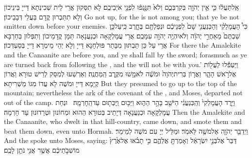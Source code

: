 {אַֽל\maqqaf תַּעֲל֔וּ כִּ֛י אֵ֥ין יְהֹוָ֖ה בְּקִרְבְּכֶ֑ם וְלֹא֙ תִּנָּ֣גְפ֔וּ לִפְנֵ֖י אֹיְבֵיכֶֽם׃}
{לָא תִסְּקוּן אֲרֵי לֵית שְׁכִינְתָא דַּייָ בֵּינֵיכוֹן וְלָא תִתַּבְרוּן קֳדָם בַּעֲלֵי דְּבָבֵיכוֹן׃}
{Go not up, for the \lord\space is not among you; that ye be not smitten down before your enemies.}{}
{כִּי֩ הָעֲמָלֵקִ֨י וְהַכְּנַעֲנִ֥י שָׁם֙ לִפְנֵיכֶ֔ם וּנְפַלְתֶּ֖ם בֶּחָ֑רֶב כִּֽי\maqqaf עַל\maqqaf כֵּ֤ן שַׁבְתֶּם֙ מֵאַחֲרֵ֣י יְהֹוָ֔ה וְלֹא\maqqaf יִהְיֶ֥ה יְהֹוָ֖ה עִמָּכֶֽם׃}
{אֲרֵי עֲמָלְקָאָה וּכְנַעֲנָאָה תַּמָּן קֳדָמֵיכוֹן וְתִפְּלוּן בְּחַרְבָּא אֲרֵי עַל כֵּן תַּבְתּוּן מִבָּתַר פּוּלְחָנָא דַּייָ וְלָא יְהֵי מֵימְרָא דַּייָ בְּסַעְדְּכוֹן׃}
{For there the Amalekite and the Canaanite are before you, and ye shall fall by the sword; forasmuch as ye are turned back from following the \lord, and the \lord\space will not be with you.’}{}
{וַיַּעְפִּ֕לוּ לַעֲל֖וֹת אֶל\maqqaf רֹ֣אשׁ הָהָ֑ר וַאֲר֤וֹן בְּרִית\maqqaf יְהֹוָה֙ וּמֹשֶׁ֔ה לֹא\maqqaf מָ֖שׁוּ מִקֶּ֥רֶב הַֽמַּחֲנֶֽה׃}
{וְאַרְשַׁעוּ לְמִסַּק לְרֵישׁ טוּרָא וַאֲרוֹן קְיָמָא דַּייָ וּמֹשֶׁה לָא עֲדוֹ מִגּוֹ מַשְׁרִיתָא׃}
{But they presumed to go up to the top of the mountain; nevertheless the ark of the covenant of the \lord, and Moses, departed not out of the camp.}{}
{וַיֵּ֤רֶד הָעֲמָלֵקִי֙ וְהַֽכְּנַעֲנִ֔י הַיֹּשֵׁ֖ב בָּהָ֣ר הַה֑וּא וַיַּכּ֥וּם וַֽיַּכְּת֖וּם עַד\maqqaf הַֽחׇרְמָֽה׃ \petucha }
{וּנְחַת עֲמָלְקָאָה וּכְנַעֲנָאָה דְּיָתֵיב בְּטוּרָא הַהוּא וּמְחוֹנוּן וּטְרַדוּנוּן עַד חָרְמָה׃}
{Then the Amalekite and the Canaanite, who dwelt in that hill-country, came down, and smote them and beat them down, even unto Hormah.}{}
\newperek
{}%
{וַיְדַבֵּ֥ר יְהֹוָ֖ה אֶל\maqqaf מֹשֶׁ֥ה לֵּאמֹֽר׃}
{וּמַלֵּיל יְיָ עִם מֹשֶׁה לְמֵימַר׃}
{And the \lord\space spoke unto Moses, saying:}{}
{דַּבֵּר֙ אֶל\maqqaf בְּנֵ֣י יִשְׂרָאֵ֔ל וְאָמַרְתָּ֖ אֲלֵהֶ֑ם כִּ֣י תָבֹ֗אוּ אֶל\maqqaf אֶ֙רֶץ֙ מוֹשְׁבֹ֣תֵיכֶ֔ם אֲשֶׁ֥ר אֲנִ֖י נֹתֵ֥ן לָכֶֽם׃}
